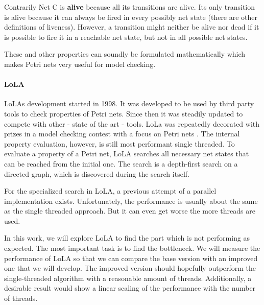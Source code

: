 Contrarily Net C is \textbf{alive} because all its transitions are alive. Its only transition is alive because it can always be fired in every possibly net state (there are other definitions of liveness\cite{murata1989petri}). However, a transition might neither be alive nor dead if it is possible to fire it in a reachable net state, but not in all possible net states.

These and other properties can soundly be formulated mathematically which makes Petri nets very useful for model checking.



\paragraph*{LoLA}
LoLAs development started in 1998. It was developed to be used by third party tools to check properties of Petri nets\cite{schmidt2000lola}. Since then it was steadily updated to compete with other - state of the art - tools. LoLa was repeatedly decorated with  prizes in a model checking contest with a focus on Petri nets \cite{MCC2017}.
The internal property evaluation, however, is still most performant single threaded. To evaluate a property of a Petri net, LoLA searches all necessary net states that can be reached from the initial one. The search is a depth-first search on a directed graph, which is discovered during the search itself.

For the specialized search in LoLA, a previous attempt of a parallel implementation exists. Unfortunately, the performance is usually about the same as the single threaded approach. But it can even get worse the more threads are used.

In this work, we will explore LoLA to find the part which is not performing as expected. The most important task is to find the bottleneck. We will measure the performance of LoLA so that we can compare the base version with an improved one that we will develop. The improved version should hopefully outperform the single-threaded algorithm with a reasonable amount of threads. Additionally, a desirable result would show a linear scaling of the performance with the number of threads.
